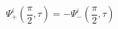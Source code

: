 \begin{equation}
\Psi_{+}^{i}(\frac{\pi}{2},\tau)=-\Psi_{-}^{i}(\frac{\pi}{2},\tau)
\end{equation}

